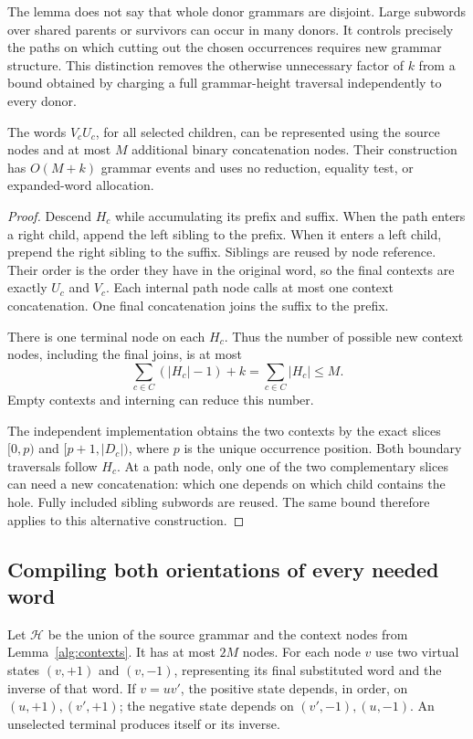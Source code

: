 The lemma does not say that whole donor grammars are disjoint. Large
subwords over shared parents or survivors can occur in many donors.
It controls precisely the paths on which cutting out the chosen
occurrences requires new grammar structure. This distinction removes
the otherwise unnecessary factor of $k$ from a bound obtained by
charging a full grammar-height traversal independently to every donor.

\begin{lemma}
\label{alg:contexts}
The words $V_cU_c$, for all selected children, can be represented using
the source nodes and at most $M$ additional binary concatenation nodes.
Their construction has $O(M+k)$ grammar events and uses no reduction,
equality test, or expanded-word allocation.
\end{lemma}

\begin{proof}
Descend $H_c$ while accumulating its prefix and suffix. When the path
enters a right child, append the left sibling to the prefix. When it
enters a left child, prepend the right sibling to the suffix. Siblings
are reused by node reference. Their order is the order they have in
the original word, so the final contexts are exactly $U_c$ and $V_c$.
Each internal path node calls at most one context concatenation.
One final concatenation joins the suffix to the prefix.

There is one terminal node on each $H_c$. Thus the number of possible
new context nodes, including the final joins, is at most
\[
 \sum_{c\in C}(|H_c|-1)+k
 =\sum_{c\in C}|H_c|\le M.
\]
Empty contexts and interning can reduce this number.

The independent implementation obtains the two contexts by the exact
slices $[0,p)$ and $[p+1,|D_c|)$, where $p$ is the unique occurrence
position. Both boundary traversals follow $H_c$. At a path node, only
one of the two complementary slices can need a new concatenation:
which one depends on which child contains the hole. Fully included
sibling subwords are reused. The same bound therefore applies to this
alternative construction.
\end{proof}

\subsection{Compiling both orientations of every needed word}

Let $\mathcal H$ be the union of the source grammar and the context
nodes from Lemma~\ref{alg:contexts}. It has at most $2M$ nodes. For
each node $v$ use two virtual states $(v,+1)$ and $(v,-1)$, representing
its final substituted word and the inverse of that word. If $v=uv'$,
the positive state depends, in order, on $(u,+1),(v',+1)$; the negative
state depends on $(v',-1),(u,-1)$. An unselected terminal produces
itself or its inverse.

